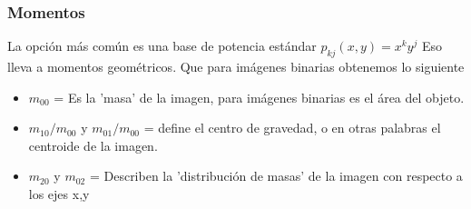 \subsubsection{Momentos}
La opción más común es una base de potencia estándar \cite{Book:Jan2009} $p_{kj}(x,y) = x^k y^j$
Eso lleva a momentos geométricos. Que para imágenes binarias obtenemos lo siguiente
\begin{itemize}
    \item $m_{00}$ =  Es la 'masa' de la imagen, para imágenes binarias es el área del objeto.
    \item $m_{10}/m_{00}$ y $m_{01}/m_{00}$ = define el centro de gravedad, o en otras palabras
          el centroide de la imagen.
    \item $m_{20}$ y $m_{02}$ = Describen la 'distribución de masas' de la imagen con respecto a
          los ejes x,y
\end{itemize}

